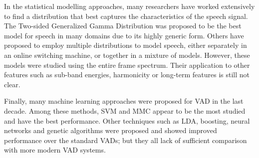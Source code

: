 In the statistical modelling approaches, many researchers have worked extensively to find a distribution that best captures the characteristics of the speech signal. The Two-sided Generalized Gamma Distribution was proposed to be the best model for speech in many domains due to its highly generic form. Others have proposed to employ multiple distributions to model speech, either separately in an online switching machine, or together in a mixture of models. However, these models were studied using the entire frame spectrum. Their application to other features such as sub-band energies, harmonicity or long-term features is still not clear.

Finally, many machine learning approaches were proposed for VAD in the last decade. Among these methods, SVM and MMC appear to be the most studied and have the best performance. Other techniques such as LDA, boosting, neural networks and genetic algorithms were proposed and showed improved performance over the standard VADs; but they all lack of sufficient comparison with more modern VAD systems.



